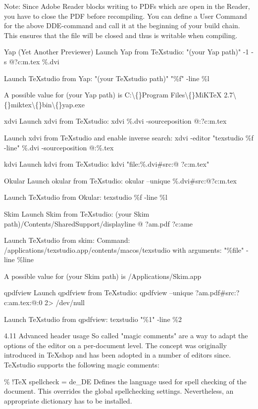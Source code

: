 \documentclass{article}
\begin{document}
	Note: Since Adobe Reader blocks writing to PDFs which are open in the Reader, you have to close the PDF before recompiling. You can define a User Command for the above DDE-command and call it at the beginning of your build chain. This ensures that the file will be closed and thus is writable when compiling.
	
	Yap (Yet Another Previewer)
	Launch Yap from TeXstudio: "(your Yap path)" -1 -s @?c:m.tex \%.dvi
	
	Launch TeXstudio from Yap: "(your TeXstudio path)" "\%f" -line \%l
	
	A possible value for (your Yap path) is C:\textbackslash\{\}Program Files\textbackslash\{\}MiKTeX 2.7\textbackslash\{\}miktex\textbackslash\{\}bin\textbackslash\{\}yap.exe
	
	xdvi
	Launch xdvi from TeXstudio: xdvi \%.dvi -sourceposition @:?c:m.tex
	
	Launch xdvi from TeXstudio and enable inverse search: xdvi -editor "texstudio \%f -line" \%.dvi -sourceposition @:\%.tex
	
	kdvi
	Launch kdvi from TeXstudio: kdvi "file:\%.dvi\#src:@ ?c:m.tex"
	
	Okular
	Launch okular from TeXstudio: okular --unique \%.dvi\#src:@?c:m.tex
	
	Launch TeXstudio from Okular: texstudio \%f -line \%l
	
	Skim
	Launch Skim from TeXstudio: (your Skim path)/Contents/SharedSupport/displayline @ ?am.pdf ?c:ame
	
	Launch TeXstudio from skim: Command: /applications/texstudio.app/contents/macos/texstudio with arguments: "\%file" -line \%line
	
	A possible value for (your Skim path) is /Applications/Skim.app
	
	qpdfview
	Launch qpdfview from TeXstudio: qpdfview --unique ?am.pdf\#src:?c:am.tex:@:0 2> /dev/null
	
	Launch TeXstudio from qpdfview: texstudio "\%1" -line \%2
	
	4.11 Advanced header usage
	So called "magic comments" are a way to adapt the options of the editor on a per-document level. The concept was originally introduced in TeXshop and has been adopted in a number of editors since. TeXstudio supports the following magic comments:
	
	\% !TeX spellcheck = de\_DE
	Defines the language used for spell checking of the document. This overrides the global spellchecking settings. Nevertheless, an appropriate dictionary has to be installed.
	
\end{document}
